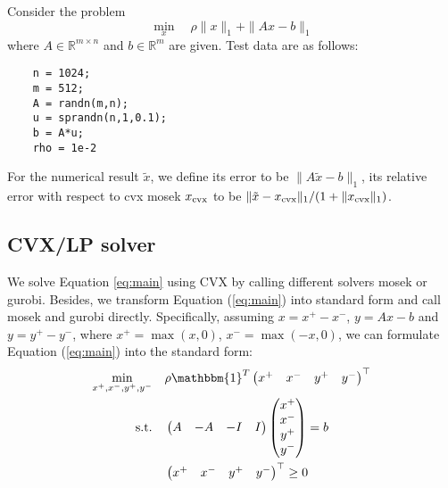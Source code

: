 \documentclass[conference,onecolumn,12pt]{IEEEtran}
\newcommand{\<}{\langle}
\renewcommand{\>}{\rangle}
\numberwithin{equation}{section}
\begin{document}
Consider the problem
\begin{equation}
\min_x\quad \rho \|x\|_1+\|Ax-b\|_1
\label{eq:main}
\end{equation}
where $A\in \mathbb{R}^{m\times n}$ and $b\in \mathbb{R}^m$ are given. Test data are as follows:
\begin{lstlisting}
    n = 1024;
    m = 512;
    A = randn(m,n);
    u = sprandn(n,1,0.1);
    b = A*u;
    rho = 1e-2
\end{lstlisting}

For the numerical result $\tilde{x}$, we define its error to be $\|A\tilde{x}-b\|_1$, its relative error with respect to cvx mosek $x_{\rm cvx}$ to be $\|\tilde{x}-x_{\rm cvx}\|_1/(1+\|x_{\rm cvx}\|_1)$.

\subsection{CVX/LP solver}

We solve Equation \ref{eq:main} using CVX by calling different solvers mosek or gurobi. Besides, we transform Equation (\ref{eq:main}) into standard form and call mosek and gurobi directly. Specifically, assuming $x = x^{+} - x^{-}$, $y = Ax-b$ and $y = y^{+} - y^{-}$, where $x^{+} = \max(x,0)$, $x^{-} = \max(-x,0)$, we can formulate Equation (\ref{eq:main}) into the standard form:
\begin{equation}\label{eq:standard}
\begin{split}
    \min_{x^{+},x^{-},y^{+},y^{-}}&\quad \rho \mathbbm{1}^{T}\left(\begin{matrix}
        x^{+}&
        x^{-}&
        y^{+}&
        y^{-}\\
    \end{matrix}
        \right)^\top \\
    \mathrm{s.t.}&\quad \left( \begin{matrix} 
        A &-A &-I&I\\
    \end{matrix} \right) \left(\begin{matrix}
        x^{+}\\
        x^{-}\\
        y^{+}\\
        y^{-}\\
    \end{matrix}
        \right) = b\\
        &\quad \left(\begin{matrix}
            x^{+}&
            x^{-}&
            y^{+}&
            y^{-}\\
        \end{matrix}
            \right)^\top  \geq 0
    \\
\end{split}
\end{equation}
\end{document}
